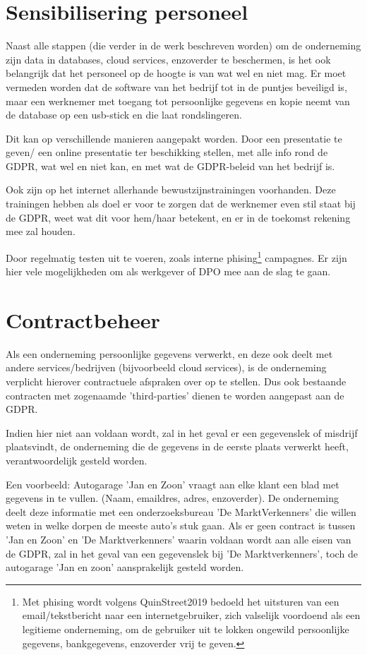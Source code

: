 \section{Sensibilisering personeel}
Naast alle stappen (die verder in de werk beschreven worden) om de onderneming zijn data in databases, cloud services, enzoverder te beschermen, is het ook belangrijk dat het personeel op de hoogte is van wat wel en niet mag. Er moet vermeden worden dat de software van het bedrijf tot in de puntjes beveiligd is, maar een werknemer met toegang tot persoonlijke gegevens en kopie neemt van de database op een usb-stick en die laat rondslingeren. 

Dit kan op verschillende manieren aangepakt worden.
 Door een presentatie te geven/ een online presentatie ter beschikking stellen, met alle info rond de GDPR, wat wel en niet kan, en met wat de GDPR-beleid  van het bedrijf is. 

Ook zijn op het internet allerhande bewustzijnstrainingen voorhanden. Deze trainingen hebben als doel er voor te zorgen dat de werknemer even stil staat bij de GDPR, weet wat dit voor hem/haar betekent, en er in de toekomst rekening mee zal houden.  

Door regelmatig testen uit te voeren, zoals interne phising\footnote{Met phising wordt volgens QuinStreet2019 bedoeld het uitsturen van een email/tekstbericht naar een internetgebruiker, zich valselijk voordoend als een legitieme onderneming, om de gebruiker uit te lokken ongewild persoonlijke gegevens, bankgegevens, enzoverder vrij te geven.} campagnes. Er zijn hier vele mogelijkheden om als werkgever of DPO mee aan de slag te gaan. 

\section{Contractbeheer}
Als een onderneming persoonlijke gegevens verwerkt, en deze ook deelt met andere services/bedrijven (bijvoorbeeld cloud services), is de onderneming verplicht hierover contractuele afspraken over op te stellen. Dus ook bestaande contracten met zogenaamde 'third-parties' dienen te worden aangepast aan de GDPR. 

Indien hier niet aan voldaan wordt, zal in het geval er een gegevenslek of misdrijf plaatsvindt, de onderneming die de gegevens in de eerste plaats verwerkt heeft, verantwoordelijk gesteld worden. 

Een voorbeeld: 
Autogarage 'Jan en Zoon' vraagt aan elke klant een blad met gegevens in te vullen. (Naam, emaildres, adres, enzoverder). De onderneming deelt deze informatie met een onderzoeksbureau 'De MarktVerkenners' die willen weten in welke dorpen de meeste auto's stuk gaan. Als er geen contract is tussen 'Jan en Zoon' en 'De Marktverkenners' waarin voldaan wordt aan alle eisen van de GDPR, zal in het geval van een gegevenslek bij 'De Marktverkenners', toch de autogarage 'Jan en zoon' aansprakelijk gesteld worden.

